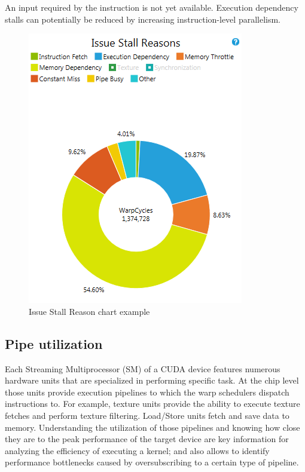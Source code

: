 \documentclass[oneside,openright,12pt,final,en]{mgr}
\begin{document}
\begin{itemize}
\begin{itemize}
		An input required by the instruction is not yet available. Execution dependency stalls can potentially be reduced by increasing instruction-level parallelism.
						
							
	\end{itemize}
	
	\begin{figure}[H]
		\centering
		\includegraphics{analysis_issue_stall_reasons}
		\caption{Issue Stall Reason chart example}
	\end{figure}
		
\end{itemize}

\subsection{Pipe utilization}

Each Streaming Multiprocessor (SM) of a CUDA device features numerous hardware units that are specialized in performing specific task. At the chip level those units provide execution pipelines to which the warp schedulers dispatch instructions to. For example, texture units provide the ability to execute texture fetches and perform texture filtering. Load/Store units fetch and save data to memory. Understanding the utilization of those pipelines and knowing how close they are to the peak performance of the target device are key information for analyzing the efficiency of executing a kernel; and also allows to identify performance bottlenecks caused by oversubscribing to a certain type of pipeline.
\end{document}
